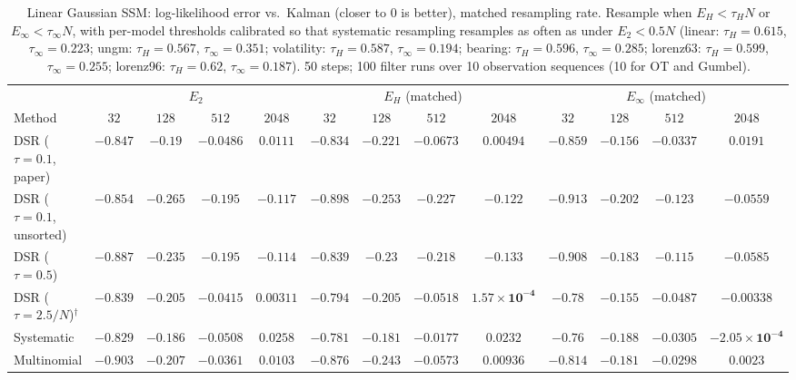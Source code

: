 \begin{table}[ht]
\centering
\small
\caption{Linear Gaussian SSM: log-likelihood error vs.\ Kalman (closer to 0 is better), matched resampling rate. Resample when $E_H<\tau_HN$ or $E_\infty<\tau_\infty N$, with per-model thresholds calibrated so that systematic resampling resamples as often as under $E_2<0.5N$ (linear: $\tau_H{=}0.615$, $\tau_\infty{=}0.223$; ungm: $\tau_H{=}0.567$, $\tau_\infty{=}0.351$; volatility: $\tau_H{=}0.587$, $\tau_\infty{=}0.194$; bearing: $\tau_H{=}0.596$, $\tau_\infty{=}0.285$; lorenz63: $\tau_H{=}0.599$, $\tau_\infty{=}0.255$; lorenz96: $\tau_H{=}0.62$, $\tau_\infty{=}0.187$). 50 steps; 100 filter runs over 10 observation sequences (10 for OT and Gumbel).}
\label{tab:trigger-matched-linear-loglik_error}
\begin{adjustbox}{max width=\linewidth}
\begin{tabular}{lcccc|cccc|cccc}
\toprule
 & \multicolumn{4}{c}{$E_2$} & \multicolumn{4}{c}{$E_H$ (matched)} & \multicolumn{4}{c}{$E_\infty$ (matched)} \\
\cmidrule(lr){2-5} \cmidrule(lr){6-9} \cmidrule(lr){10-13}
Method & $32$ & $128$ & $512$ & $2048$ & $32$ & $128$ & $512$ & $2048$ & $32$ & $128$ & $512$ & $2048$ \\
\midrule
DSR ($\tau{=}0.1$, paper) & $-0.847$ & $-0.19$ & $-0.0486$ & $0.0111$ & $\mathbf{-0.834}$ & $-0.221$ & $-0.0673$ & $\mathbf{0.00494}$ & $-0.859$ & $\mathbf{-0.156}$ & $\mathbf{-0.0337}$ & $0.0191$ \\
DSR ($\tau{=}0.1$, unsorted) & $\mathbf{-0.854}$ & $-0.265$ & $-0.195$ & $-0.117$ & $-0.898$ & $-0.253$ & $-0.227$ & $-0.122$ & $-0.913$ & $\mathbf{-0.202}$ & $\mathbf{-0.123}$ & $\mathbf{-0.0559}$ \\
DSR ($\tau{=}0.5$) & $-0.887$ & $-0.235$ & $-0.195$ & $-0.114$ & $\mathbf{-0.839}$ & $-0.23$ & $-0.218$ & $-0.133$ & $-0.908$ & $\mathbf{-0.183}$ & $\mathbf{-0.115}$ & $\mathbf{-0.0585}$ \\
DSR ($\tau{=}2.5/N$)$^\dagger$ & $-0.839$ & $-0.205$ & $\mathbf{-0.0415}$ & $0.00311$ & $-0.794$ & $-0.205$ & $-0.0518$ & $\mathbf{1.57\times10^{-4}}$ & $\mathbf{-0.78}$ & $\mathbf{-0.155}$ & $-0.0487$ & $-0.00338$ \\
\midrule
Systematic & $-0.829$ & $-0.186$ & $-0.0508$ & $0.0258$ & $-0.781$ & $\mathbf{-0.181}$ & $\mathbf{-0.0177}$ & $0.0232$ & $\mathbf{-0.76}$ & $-0.188$ & $-0.0305$ & $\mathbf{-2.05\times10^{-4}}$ \\
Multinomial & $-0.903$ & $-0.207$ & $-0.0361$ & $0.0103$ & $-0.876$ & $-0.243$ & $-0.0573$ & $0.00936$ & $\mathbf{-0.814}$ & $\mathbf{-0.181}$ & $\mathbf{-0.0298}$ & $\mathbf{0.0023}$ \\

\end{tabular}
\end{adjustbox}
\end{table}
